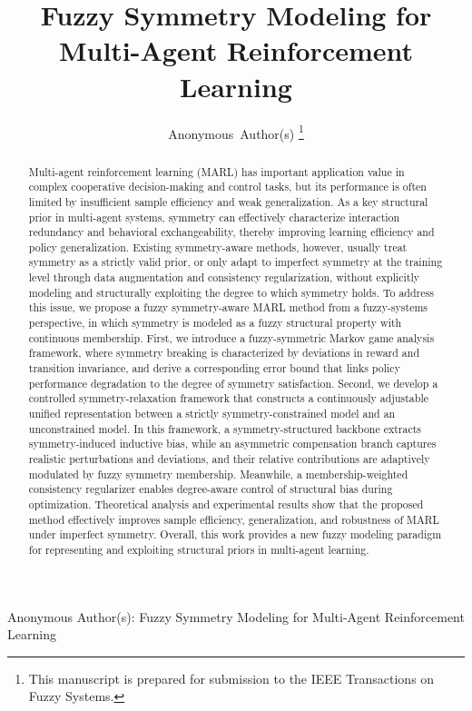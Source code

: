 \documentclass[lettersize,journal]{IEEEtran}
\begin{document}
\title{Fuzzy Symmetry Modeling for Multi-Agent Reinforcement Learning}

\author{Anonymous~Author(s)
\thanks{This manuscript is prepared for submission to the IEEE Transactions on Fuzzy Systems.}
}

%
{Anonymous Author(s): Fuzzy Symmetry Modeling for Multi-Agent Reinforcement Learning}

\maketitle

\begin{abstract}
Multi-agent reinforcement learning (MARL) has important application value in complex cooperative decision-making and control tasks, but its performance is often limited by insufficient sample efficiency and weak generalization. As a key structural prior in multi-agent systems, symmetry can effectively characterize interaction redundancy and behavioral exchangeability, thereby improving learning efficiency and policy generalization. Existing symmetry-aware methods, however, usually treat symmetry as a strictly valid prior, or only adapt to imperfect symmetry at the training level through data augmentation and consistency regularization, without explicitly modeling and structurally exploiting the degree to which symmetry holds. To address this issue, we propose a fuzzy symmetry-aware MARL method from a fuzzy-systems perspective, in which symmetry is modeled as a fuzzy structural property with continuous membership. First, we introduce a fuzzy-symmetric Markov game analysis framework, where symmetry breaking is characterized by deviations in reward and transition invariance, and derive a corresponding error bound that links policy performance degradation to the degree of symmetry satisfaction. Second, we develop a controlled symmetry-relaxation framework that constructs a continuously adjustable unified representation between a strictly symmetry-constrained model and an unconstrained model. In this framework, a symmetry-structured backbone extracts symmetry-induced inductive bias, while an asymmetric compensation branch captures realistic perturbations and deviations, and their relative contributions are adaptively modulated by fuzzy symmetry membership. Meanwhile, a membership-weighted consistency regularizer enables degree-aware control of structural bias during optimization. Theoretical analysis and experimental results show that the proposed method effectively improves sample efficiency, generalization, and robustness of MARL under imperfect symmetry. Overall, this work provides a new fuzzy modeling paradigm for representing and exploiting structural priors in multi-agent learning.
\end{abstract}
\end{document}
